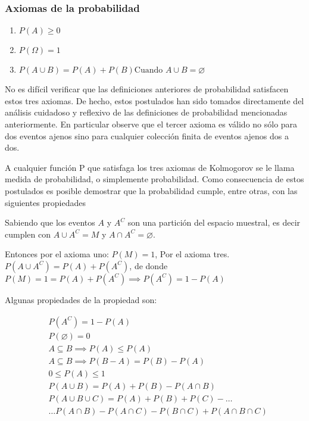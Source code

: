 \subsubsection{Axiomas de la probabilidad}

\begin{enumerate}
    \item $P(A)\geq 0$
    \item $P(\Omega)=1$
    \item $P(A\cup B)=P(A)+P(B) \text{Cuando } A\cup B=\varnothing$
\end{enumerate}

No es difícil verificar que las definiciones anteriores de
probabilidad satisfacen estos tres axiomas. De hecho, estos
postulados han sido tomados directamente del análisis
cuidadoso y reflexivo de las definiciones de probabilidad
mencionadas anteriormente. En particular observe que el
tercer axioma es válido no sólo para dos eventos ajenos
sino para cualquier colección finita de eventos ajenos dos a
dos.

A cualquier función P que satisfaga los tres axiomas de
Kolmogorov se le llama medida de probabilidad, o
simplemente probabilidad. Como consecuencia de estos
postulados es posible demostrar que la probabilidad cumple,
entre otras, con las siguientes propiedades

\begin{example}
    Sabiendo que los eventos $A$ y $A^C$ son una partición del
    espacio muestral, es decir cumplen con $A\cup A^C =M$ y $A \cap A^C =\varnothing$.

    Entonces por el axioma uno: $P(M)=1$, Por el axioma tres. $P(A\cup A^C )=P(A)+P(A^C)$,
    de donde $P(M)=1=P(A)+P(A^C) \implies P(A^C)=1-P(A)$
\end{example}


Algunas propiedades de la propiedad son:

\begin{align*}
    & P(A^C)=1-P(A)                                                                     \\ &P(\varnothing)=0\\ &A\subseteq B \implies P(A)\leq P(A)\\
    & A\subseteq B \implies P(B-A)=P(B)-P(A)                                            \\&0\leq P(A) \leq 1\\& P(A\cup B)=P(A)+P(B)-P(A\cap B)\\
    & P(A\cup B\cup C)=P(A)+P(B)+P(C)-\dots\\
    &\dots P(A\cap B)-P(A\cap C)-P(B\cap C)+P(A\cap B\cap C)
\end{align*}

